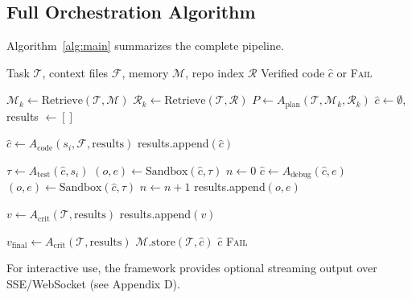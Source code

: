 \documentclass[journal]{IEEEtran}
\begin{document}
\subsection{Full Orchestration Algorithm}
\label{sec:algorithm}

Algorithm~\ref{alg:main} summarizes the complete pipeline.

\begin{algorithm}[t]
\caption{AgentForge Orchestration}
\label{alg:main}
\begin{algorithmic}[1]
\REQUIRE Task $\mathcal{T}$, context files $\mathcal{F}$,
         memory $\mathcal{M}$, repo index $\mathcal{R}$
\ENSURE  Verified code $\hat{c}$ or \textsc{Fail}

\STATE $\mathcal{M}_k \leftarrow \text{Retrieve}(\mathcal{T}, \mathcal{M})$
\STATE $\mathcal{R}_k \leftarrow \text{Retrieve}(\mathcal{T}, \mathcal{R})$
\STATE $P \leftarrow A_\text{plan}(\mathcal{T}, \mathcal{M}_k, \mathcal{R}_k)$
\STATE $\hat{c} \leftarrow \emptyset$,\; results $\leftarrow []$

    \STATE $\hat{c} \leftarrow A_\text{code}(s_i, \mathcal{F}, \text{results})$
    \STATE results.append$(\hat{c})$

    \STATE $\tau \leftarrow A_\text{test}(\hat{c}, s_i)$
    \STATE $(o, e) \leftarrow \text{Sandbox}(\hat{c}, \tau)$
    \STATE $n \leftarrow 0$
      \STATE $\hat{c} \leftarrow A_\text{debug}(\hat{c}, e)$
      \STATE $(o, e) \leftarrow \text{Sandbox}(\hat{c}, \tau)$
      \STATE $n \leftarrow n + 1$
    \ENDWHILE
    \STATE results.append$(o, e)$

    \STATE $v \leftarrow A_\text{crit}(\mathcal{T}, \text{results})$
    \STATE results.append$(v)$
  \ENDIF
\ENDFOR

\STATE $v_\text{final} \leftarrow A_\text{crit}(\mathcal{T}, \text{results})$
  \STATE $\mathcal{M}.\text{store}(\mathcal{T}, \hat{c})$
  \RETURN $\hat{c}$
\ELSE
  \RETURN \textsc{Fail}
\ENDIF
\end{algorithmic}
\end{algorithm}

For interactive use, the framework provides optional streaming output over SSE/WebSocket (see Appendix D).
\end{document}
